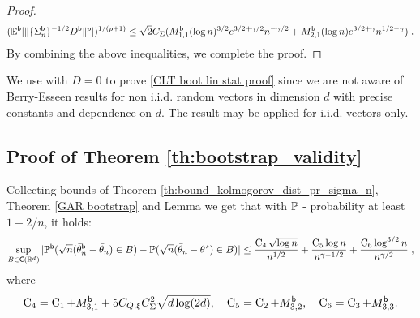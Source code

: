 \begin{proof}
\begin{equation}
    (\mathbb{E}^{\mathsf{b}}[\|\{\Sigma_n^{\mathsf{b}}\}^{-1/2} D^{\mathsf{b}}\|^p])^{1/(p+1)} \leq 
    \sqrt{2}C_{\Sigma}(M_{1,1}^{\mathsf{b}}(\log n)^{3/2} e^{3/2+\gamma/2}n^{-\gamma/2}+  M_{2,1}^{\mathsf{b}} (\log n) e^{3/2+\gamma}n^{1/2-\gamma})\;.
\end{equation}
By combining the above inequalities, we complete the proof.
\end{proof}
\begin{remark}
We use \citep{shao2022berry} with $D = 0$ to prove \eqref{CLT boot lin stat proof} since we are not aware of Berry-Esseen results for non i.i.d. random vectors in dimension $d$ with precise constants and dependence on $d$. The result \cite{BENTKUS2003385} may be applied for i.i.d. vectors only. 
\end{remark}

\subsection{Proof of Theorem \ref{th:bootstrap_validity}}
Collecting bounds of Theorem \ref{th:bound_kolmogorov_dist_pr_sigma_n}, Theorem \ref{GAR bootstrap} and Lemma we get that with $\mathbb{P}$ - probability at least $1 - 2/n$, it holds:
\begin{multline}
  \sup_{B \in \mathsf{C}(\mathbb{R}^{d})} |\mathbb{P}^{\mathsf{b}}(\sqrt n (\bar{\theta}_{n}^{\mathsf{b}} - \bar{\theta}_n) \in B ) - \mathbb{P}(\sqrt n (\bar{\theta}_n - \theta^\star) \in B)| \le   \frac{\operatorname{C}_4 \sqrt{\log n}}{n^{1/2}} + \frac{\operatorname{C}_5 \log n}{n^{\gamma - 1/2} } +  \frac{\operatorname{C}_6 \log^{3/2} n}{n^{\gamma/2}} \;, 
\end{multline}
where 
\begin{align}
\label{eq: bootsrap constants def}
    \operatorname{C}_{4} = \operatorname{C}_1 + M_{3,1}^{\mathsf{b}} + 5C_{Q,\xi} C_\Sigma^2 \sqrt{d \log(2d)}, \quad \operatorname{C}_{5} = \operatorname{C}_2 + M_{3,2}^{\mathsf{b}}, \quad \operatorname{C}_{6} =  \operatorname{C}_{3} + M_{3,3}^{\mathsf{b}}. 
\end{align}




 


